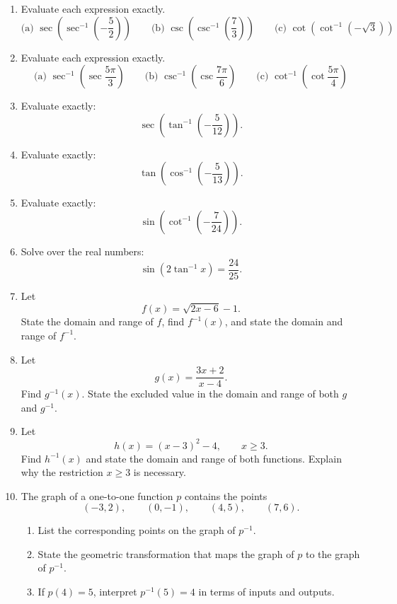 \documentclass[12pt]{article}
\begin{document}
\begin{enumerate}[leftmargin=*,itemsep=1.15em]
  \item Evaluate each expression exactly.
  \[
    \text{(a) }\sec\left(\sec^{-1}\left(-\frac52\right)\right)
    \qquad
    \text{(b) }\csc\left(\csc^{-1}\left(\frac73\right)\right)
    \qquad
    \text{(c) }\cot\left(\cot^{-1}(-\sqrt3)\right)
  \]

  \item Evaluate each expression exactly.
  \[
    \text{(a) }\sec^{-1}\left(\sec\frac{5\pi}{3}\right)
    \qquad
    \text{(b) }\csc^{-1}\left(\csc\frac{7\pi}{6}\right)
    \qquad
    \text{(c) }\cot^{-1}\left(\cot\frac{5\pi}{4}\right)
  \]

  \item Evaluate exactly:
  \[
    \sec\left(\tan^{-1}\left(-\frac5{12}\right)\right).
  \]

  \item Evaluate exactly:
  \[
    \tan\left(\cos^{-1}\left(-\frac{5}{13}\right)\right).
  \]

  \item Evaluate exactly:
  \[
    \sin\left(\cot^{-1}\left(-\frac7{24}\right)\right).
  \]

  \item Solve over the real numbers:
  \[
    \sin(2\tan^{-1}x)=\frac{24}{25}.
  \]

  \item Let
  \[
    f(x)=\sqrt{2x-6}-1.
  \]
  State the domain and range of $f$, find $f^{-1}(x)$, and state the domain and range of $f^{-1}$.

  \item Let
  \[
    g(x)=\frac{3x+2}{x-4}.
  \]
  Find $g^{-1}(x)$. State the excluded value in the domain and range of both $g$ and $g^{-1}$.

  \item Let
  \[
    h(x)=(x-3)^2-4,\qquad x\ge3.
  \]
  Find $h^{-1}(x)$ and state the domain and range of both functions. Explain why the restriction $x\ge3$ is necessary.

  \item The graph of a one-to-one function $p$ contains the points
  \[
    (-3,2),\qquad (0,-1),\qquad (4,5),\qquad (7,6).
  \]
  \begin{enumerate}[label=(\alph*),itemsep=0.3em]
    \item List the corresponding points on the graph of $p^{-1}$.
    \item State the geometric transformation that maps the graph of $p$ to the graph of $p^{-1}$.
    \item If $p(4)=5$, interpret $p^{-1}(5)=4$ in terms of inputs and outputs.
  \end{enumerate}


\end{enumerate}
\end{document}
